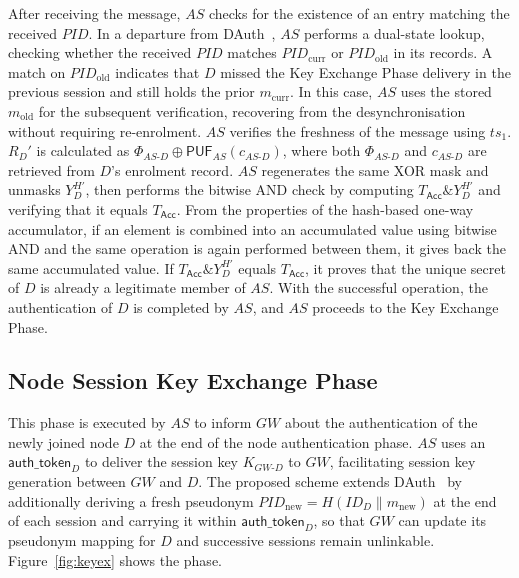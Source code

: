\documentclass[conference]{IEEEtran}
\begin{document}
After receiving the message, $AS$ checks for the existence of an entry matching
the received $\mathit{PID}$.  In a departure from DAuth~\cite{das2026comsnets}, $AS$ performs
a dual-state lookup, checking whether the received $\mathit{PID}$ matches
$\mathit{PID}_{\mathrm{curr}}$ or $\mathit{PID}_{\mathrm{old}}$ in its records.
A match on $\mathit{PID}_{\mathrm{old}}$ indicates that $D$ missed the Key
Exchange Phase delivery in the previous session and still holds the prior
$m_{\mathrm{curr}}$. In this case, $AS$ uses the stored $m_{\mathrm{old}}$ for
the subsequent verification, recovering from the desynchronisation without
requiring re-enrolment.  $AS$ verifies the freshness of the message using $ts_1$.  $R_D'$ is
calculated as $\Phi_{AS\text{-}D} \oplus \mathsf{PUF}_{AS}(c_{AS\text{-}D})$,
where both $\Phi_{AS\text{-}D}$ and $c_{AS\text{-}D}$ are retrieved from $D$'s
enrolment record.  $AS$ regenerates the same XOR mask and unmasks $Y_D^{H'}$,
then performs the bitwise AND check by computing
$T_\mathsf{Acc} \mathbin{\&} Y_D^{H'}$ and verifying that it equals $T_\mathsf{Acc}$.
From the properties of the hash-based one-way accumulator, if an element is
combined into an accumulated value using bitwise AND and the same operation is
again performed between them, it gives back the same accumulated value.  If
$T_\mathsf{Acc} \mathbin{\&} Y_D^{H'}$ equals $T_\mathsf{Acc}$, it proves that the unique
secret of $D$ is already a legitimate member of $AS$.  With the successful
operation, the authentication of $D$ is completed by $AS$, and $AS$ proceeds
to the Key Exchange Phase.

\subsection{Node Session Key Exchange Phase}

This phase is executed by $AS$ to inform $GW$ about the authentication of the
newly joined node $D$ at the end of the node authentication phase.  $AS$ uses
an $\mathsf{auth\_token}_D$ to deliver the session key $K_{GW\text{-}D}$ to
$GW$, facilitating session key generation between $GW$ and $D$.  The proposed
scheme extends DAuth~\cite{das2026comsnets} by additionally deriving
a fresh pseudonym $\mathit{PID}_{\mathrm{new}} = H(ID_D \| m_{\mathrm{new}})$
at the end of each session and carrying it within $\mathsf{auth\_token}_D$, so
that $GW$ can update its pseudonym mapping for $D$ and successive sessions
remain unlinkable.  Figure~\ref{fig:keyex} shows the phase.
\end{document}
